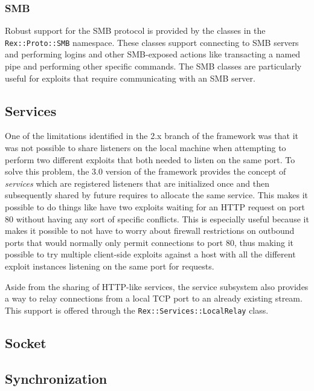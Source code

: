 \documentclass{report}
\begin{document}
            \subsubsection{SMB}

\par
Robust support for the SMB protocol is provided by the classes in
the \texttt{Rex::Proto::SMB} namespace.  These classes support
connecting to SMB servers and performing logins and other
SMB-exposed actions like transacting a named pipe and performing
other specific commands.  The SMB classes are particularly useful
for exploits that require communicating with an SMB server.

        \subsection{Services}

\par
One of the limitations identified in the 2.x branch of the framework
was that it was not possible to share listeners on the local machine
when attempting to perform two different exploits that both needed
to listen on the same port.  To solve this problem, the 3.0 version
of the framework provides the concept of \textit{services} which are
registered listeners that are initialized once and then subsequently
shared by future requires to allocate the same service.  This makes
it possible to do things like have two exploits waiting for an HTTP
request on port 80 without having any sort of specific conflicts.
This is especially useful because it makes it possible to not have
to worry about firewall restrictions on outbound ports that would
normally only permit connections to port 80, thus making it possible
to try multiple client-side exploits against a host with all the
different exploit instances listening on the same port for requests.

\par
Aside from the sharing of HTTP-like services, the service subsystem
also provides a way to relay connections from a local TCP port to an
already existing stream.  This support is offered through the
\texttt{Rex::Services::LocalRelay} class.

        \subsection{Socket}
        \subsection{Synchronization}
\end{document}
